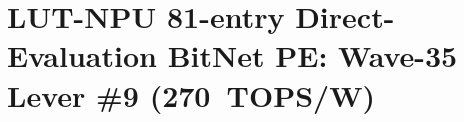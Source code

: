 %

\chapter{LUT-NPU 81-entry Direct-Evaluation BitNet PE: Wave-35 Lever \#9 (270~TOPS/W)}%
\label{ch:lut-npu-wave35}

